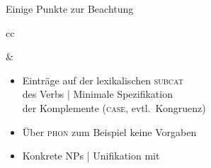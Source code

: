\begin{frame}
  {Einige Punkte zur Beachtung}
  \onslide<+->
  \onslide<+->
  \centering 
  \begin{tabular}[h]{cc}
    \begin{minipage}{0.35\textwidth}
    \end{minipage} & %
    \begin{minipage}{0.55\textwidth}
      \begin{itemize}[<+->]
        \item Einträge auf der lexikalischen \textsc{subcat}\\
          des Verbs | Minimale Spezifikation\\
          der Komplemente (\textsc{case}, evtl.\ Kongruenz)
        \item Über \textsc{phon} zum Beispiel keine Vorgaben
        \item Konkrete NPs | \alert{Unifikation} mit\\

\end{itemize}
\end{minipage}
\end{tabular}
\end{frame}
